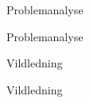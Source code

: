 



\begin{folderinput}{Problemanalyse}

\end{folderinput}{Problemanalyse}

\begin{folderinput}{Vildledning}

\end{folderinput}{Vildledning}

